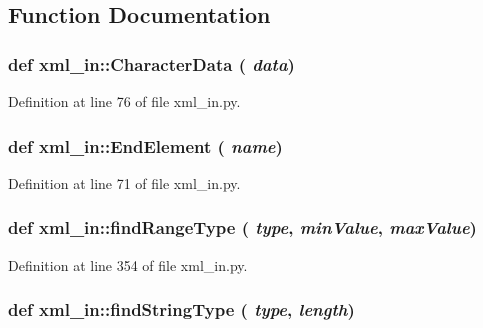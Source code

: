 \subsection{Function Documentation}
\hypertarget{namespacexml__in_40875b2bc42a3db80aaedc214f8da3d7}{
\subsubsection[CharacterData]{\setlength{\rightskip}{0pt plus 5cm}def xml\_\-in::Character\-Data ( {\em data})}}
\label{namespacexml__in_40875b2bc42a3db80aaedc214f8da3d7}




Definition at line 76 of file xml\_\-in.py.\hypertarget{namespacexml__in_152ef8abb29428e5a4f6883d0b9c1036}{
\subsubsection[EndElement]{\setlength{\rightskip}{0pt plus 5cm}def xml\_\-in::End\-Element ( {\em name})}}
\label{namespacexml__in_152ef8abb29428e5a4f6883d0b9c1036}




Definition at line 71 of file xml\_\-in.py.\hypertarget{namespacexml__in_826fcdb3b500cd56bccd4290f39397d9}{
\subsubsection[findRangeType]{\setlength{\rightskip}{0pt plus 5cm}def xml\_\-in::find\-Range\-Type ( {\em type},  {\em min\-Value},  {\em max\-Value})}}
\label{namespacexml__in_826fcdb3b500cd56bccd4290f39397d9}




Definition at line 354 of file xml\_\-in.py.\hypertarget{namespacexml__in_7f11bfdc69b5c39650c9edf1ab83b08b}{
\subsubsection[findStringType]{\setlength{\rightskip}{0pt plus 5cm}def xml\_\-in::find\-String\-Type ( {\em type},  {\em length})}}
\label{namespacexml__in_7f11bfdc69b5c39650c9edf1ab83b08b}




